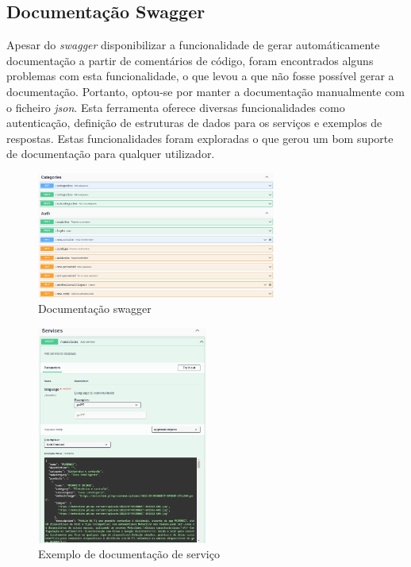 \newpage

\subsection{Documentação Swagger}
Apesar do \textit{swagger} disponibilizar a funcionalidade de gerar automáticamente documentação a partir de comentários de código, foram encontrados alguns problemas com esta funcionalidade, o que levou a que não fosse possível gerar a documentação. Portanto, optou-se por manter a documentação manualmente com o ficheiro \textit{\acrshort{json}}. Esta ferramenta oferece diversas funcionalidades como autenticação, definição de estruturas de dados para os serviços e exemplos de respostas. Estas funcionalidades foram exploradas o que gerou um bom suporte de documentação para qualquer utilizador.

\begin{figure}[htb]
 \centering
 \includegraphics[width=0.7\textwidth]{images/implementacao/api/swagger_intro.png}
 \caption{Documentação swagger}
 \label{fig:67}
\end{figure}

\begin{figure}[htb]
 \centering
 \includegraphics[width=0.5\textwidth]{images/implementacao/api/swagger_pedido.png}
 \caption{Exemplo de documentação de serviço}
 \label{fig:68}
\end{figure}